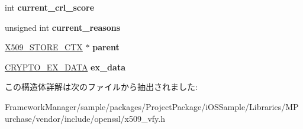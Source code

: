 \begin{DoxyCompactItemize}
\item 
\hypertarget{structx509__store__ctx__st_a1cd61fb468f397eb179143f18664cfe3}{}int {\bfseries current\+\_\+crl\+\_\+score}\label{structx509__store__ctx__st_a1cd61fb468f397eb179143f18664cfe3}

\item 
\hypertarget{structx509__store__ctx__st_ae2ab9b215c63995eaef346e6a1fde845}{}unsigned int {\bfseries current\+\_\+reasons}\label{structx509__store__ctx__st_ae2ab9b215c63995eaef346e6a1fde845}

\item 
\hypertarget{structx509__store__ctx__st_a647b1547f675fde39774de2672fdbf69}{}\hyperlink{structx509__store__ctx__st}{X509\+\_\+\+S\+T\+O\+R\+E\+\_\+\+C\+T\+X} $\ast$ {\bfseries parent}\label{structx509__store__ctx__st_a647b1547f675fde39774de2672fdbf69}

\item 
\hypertarget{structx509__store__ctx__st_a30a9b2bc4ea6479c2ce84b1a169cedd4}{}\hyperlink{structcrypto__ex__data__st}{C\+R\+Y\+P\+T\+O\+\_\+\+E\+X\+\_\+\+D\+A\+T\+A} {\bfseries ex\+\_\+data}\label{structx509__store__ctx__st_a30a9b2bc4ea6479c2ce84b1a169cedd4}

\end{DoxyCompactItemize}


この構造体詳解は次のファイルから抽出されました\+:\begin{DoxyCompactItemize}
\item 
Framework\+Manager/sample/packages/\+Project\+Package/i\+O\+S\+Sample/\+Libraries/\+M\+Purchase/vendor/include/openssl/x509\+\_\+vfy.\+h\end{DoxyCompactItemize}
